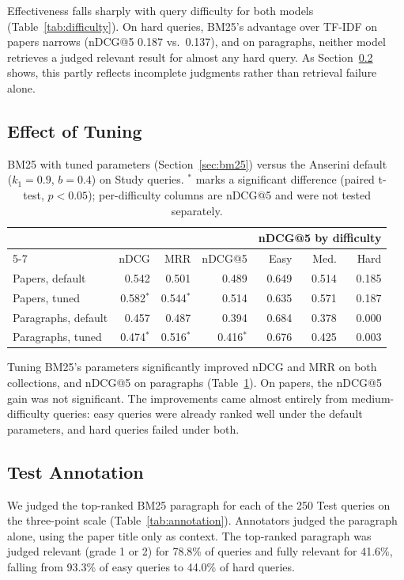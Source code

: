 \documentclass[sigconf,nonacm]{acmart}
\begin{document}
Effectiveness falls sharply with query difficulty for both models
(Table~\ref{tab:difficulty}). On hard queries, BM25's advantage over
TF-IDF on papers narrows (nDCG@5 0.187 vs.\ 0.137), and on paragraphs, 
neither model retrieves a judged relevant result for almost any hard query. 
As Section~\ref{sec:annotation} shows, this partly reflects incomplete 
judgments rather than retrieval failure alone.

\subsection{Effect of Tuning}
\label{sec:tuning-results}

\begin{table}[t]
  \caption{BM25 with tuned parameters (Section~\ref{sec:bm25}) versus the
    Anserini default ($k_1 = 0.9$, $b = 0.4$) on Study queries.
    $^{*}$ marks a significant difference (paired t-test, $p < 0.05$);
    per-difficulty columns are nDCG@5 and were not tested separately.}
  \label{tab:tuning-study}
  \small
  \setlength{\tabcolsep}{4pt}
  \begin{tabular}{lrrrrrr}
    \toprule
    & & & & \multicolumn{3}{c}{nDCG@5 by difficulty} \\
    \cmidrule(l){5-7}
    & nDCG & MRR & nDCG@5 & Easy & Med. & Hard \\
    \midrule
    Papers, default      & 0.542 & 0.501 & 0.489 & 0.649 & 0.514 & 0.185 \\
    Papers, tuned        & 0.582$^{*}$ & 0.544$^{*}$ & 0.514 & 0.635 & 0.571 & 0.187 \\
    \midrule
    Paragraphs, default  & 0.457 & 0.487 & 0.394 & 0.684 & 0.378 & 0.000 \\
    Paragraphs, tuned    & 0.474$^{*}$ & 0.516$^{*}$ & 0.416$^{*}$ & 0.676 & 0.425 & 0.003 \\
    \bottomrule
  \end{tabular}
\end{table}

Tuning BM25's parameters significantly improved nDCG and MRR on both collections, and
nDCG@5 on paragraphs (Table~\ref{tab:tuning-study}). On papers, the
nDCG@5 gain was not significant. The improvements came almost entirely
from medium-difficulty queries: easy queries were already ranked well
under the default parameters, and hard queries failed under both.

\subsection{Test Annotation}
\label{sec:annotation}
We judged the top-ranked BM25 paragraph for each of the 250 Test queries
on the three-point scale (Table~\ref{tab:annotation}). Annotators judged
the paragraph alone, using the paper title only as context. The
top-ranked paragraph was judged relevant (grade 1 or 2) for 78.8\% of
queries and fully relevant for 41.6\%, falling from 93.3\% of easy
queries to 44.0\% of hard queries.
\end{document}
